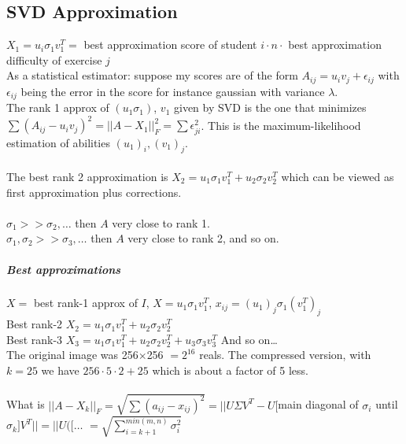 \documentclass[10pt]{report}
\begin{document}
\subsection{SVD Approximation} $X_1 = u_i\sigma_1 v_1^T =$ best approximation score of student $i \cdot n \cdot$ best approximation difficulty of exercise $j$\\
As a statistical estimator: suppose my scores are of the form $A_{ij} = u_i v_j + \epsilon_{ij}$ with $\epsilon_{ij}$ being the error in the score for instance gaussian with variance $\lambda$.\\
The rank 1 approx of $(u_1\sigma_1)$, $v_1$ given by SVD is the one that minimizes $\sum (A_{ij} - u_iv_j)^2 = ||A-X_1||_F^2 = \sum \epsilon_{ji}^2$. This is the maximum-likelihood estimation of abilities $(u_1)_i, (v_1)_j$.\\\\
The best rank 2 approximation is $X_2 = u_1\sigma_1 v_1^T + u_2\sigma_2 v_2^T$ which can be viewed as first approximation plus corrections.\\\\
$\sigma_1 >> \sigma_2,\ldots$ then $A$ very close to rank 1.\\
$\sigma_1, \sigma_2 >> \sigma_3,\ldots$ then $A$ very close to rank 2, and so on.
\subparagraph{Best approximations} $X =$ best rank-1 approx of $I$, $X = u_1\sigma_1 v_1^T$, $x_{ij} = (u_1)_j \sigma_1 (v_1^T)_j$\\
Best rank-2 $X_2 = u_1\sigma_1 v_1^T + u_2 \sigma_2 v_2^T$\\
Best rank-3 $X_3 = u_1\sigma_1 v_1^T + u_2 \sigma_2 v_2^T + u_3 \sigma_3 v_3^T$
And so on\ldots\\
The original image was 256$\times$256 $= 2^{16}$ reals. The compressed version, with $k = 25$ we have $256\cdot5\cdot2 + 25$ which is about a factor of 5 less.\\\\
What is $||A - X_k||_F = \sqrt{\sum (a_{ij} - x_{ij})^2} = ||U\Sigma V^T - U[$main diagonal of $\sigma_i$ until $\sigma_k] V^T|| = ||U([\ldots$ %
$= \sqrt{\sum_{i=k+1}^{min(m,n)} \sigma_i^2}$
\end{document}
